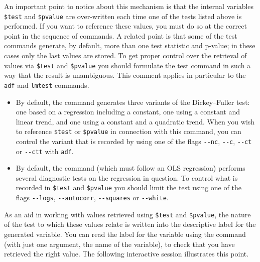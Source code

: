 An important point to notice about this mechanism is that the internal
variables \verb+$test+ and \verb+$pvalue+ are over-written each time
one of the tests listed above is performed.  If you want to reference
these values, you must do so at the correct point in the sequence of
 commands.  A related point is that some of the test
commands generate, by default, more than one test statistic and
p-value; in these cases only the last values are stored. To get proper
control over the retrieval of values via \verb+$test+ and
\verb+$pvalue+ you should formulate the test command in such a way
that the result is unambiguous.  This comment applies in particular to
the \verb+adf+ and \verb+lmtest+ commands.
\begin{itemize}
\item By default, the  command generates three variants of
  the Dickey--Fuller test: one based on a regression including a
  constant, one using a constant and linear trend, and one using a
  constant and a quadratic trend.  When you wish to reference
  \verb+$test+ or \verb+$pvalue+ in connection with this command, you
  can control the variant that is recorded by using one of the flags
  \verb+--nc+, \verb+--c+, \verb+--ct+ or \verb+--ctt+ with
  \verb+adf+.
	
\item By default, the  command (which must follow an OLS
  regression) performs several diagnostic tests on the regression in
  question.  To control what is recorded in \verb+$test+ and
  \verb+$pvalue+ you should limit the test using one of the flags
  \verb+--logs+, \verb+--autocorr+, \verb+--squares+ or
  \verb+--white+.
	
\end{itemize}

As an aid in working with values retrieved using \verb+$test+ and
\verb+$pvalue+, the nature of the test to which these values relate is
written into the descriptive label for the generated variable.  You
can read the label for the variable using the  command
(with just one argument, the name of the variable), to check that you
have retrieved the right value.  The following interactive session
illustrates this point.



